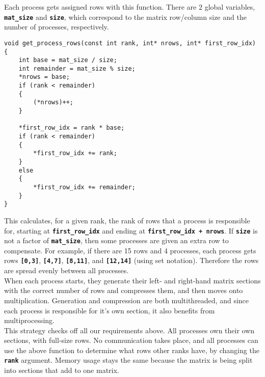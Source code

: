 \documentclass[11pt,leqno]{article}
\begin{document}
\begin{flushleft}
Each process gets assigned rows with this function. There are $2$ global variables, \textbf{\texttt{mat_size}} and \textbf{\texttt{size}}, which correspond to the matrix row/column size and the number of processes, respectively.

\begin{verbatim}
void get_process_rows(const int rank, int* nrows, int* first_row_idx)
{
    int base = mat_size / size;
    int remainder = mat_size % size;
    *nrows = base;
    if (rank < remainder)
    {
        (*nrows)++;
    }

    *first_row_idx = rank * base;
    if (rank < remainder)
    {
        *first_row_idx += rank;
    }
    else
    {
        *first_row_idx += remainder;
    }
}
\end{verbatim}

This calculates, for a given rank, the rank of rows that a process is
responsible for, starting at \textbf{\texttt{first_row_idx}}
and ending at \textbf{\texttt{first_row_idx + nrows}}. If
\textbf{\texttt{size}} is not a factor of \textbf{\texttt{mat_size}}, then some processes are given an extra row to compensate. For example, if there are 15 rows and 4 processes, each process gets rows \textbf{\texttt{[}}\textbf{\texttt{0,3}}\textbf{\texttt{]}}, \textbf{\texttt{[}}\textbf{\texttt{4,7}}\textbf{\texttt{]}}, \textbf{\texttt{[}}\textbf{\texttt{8,11}}\textbf{\texttt{]}}, and \textbf{\texttt{[}}\textbf{\texttt{12,14}}\textbf{\texttt{]}} (using set notation). Therefore the rows are spread evenly between all processes.  \\[2 ex]

When each process starts, they generate their left- and right-hand matrix sections with the correct number of rows and compresses them, and then moves onto multiplication. Generation and compression are both multithreaded, and since each process is responsible for it's own section, it also benefits from multiprocessing.  \\[2 ex]

This strategy checks off all our requirements above. All processes own
their own sections, with full-size rows. No communication takes place,
and all processes can use the above function to determine what rows
other ranks have, by changing the \textbf{\texttt{rank}}
argument. Memory usage stays the same because the matrix is being split
into sections that add to one matrix.


\end{flushleft}
\end{document}
